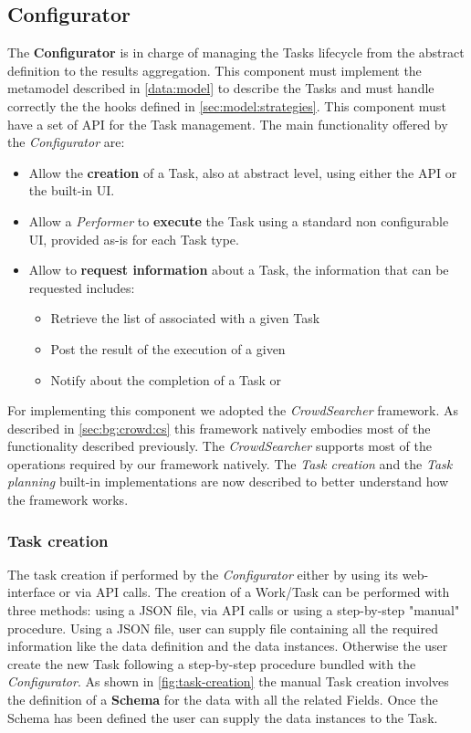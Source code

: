 \subsection{Configurator}\label{sec:configurator}
The \textbf{Configurator} is in charge of managing the Tasks lifecycle
from the abstract definition to the results aggregation. This component must
implement the metamodel described in \ref{data:model} to describe the Tasks and
must handle correctly the the hooks defined in \ref{sec:model:strategies}. This
component must have a set of API for the Task management.
The main functionality offered by the \emph{Configurator} are:
\begin{itemize}
    \item Allow the \textbf{creation} of a Task, also at abstract level, using
    either the API or the built-in UI.

    \item Allow a \emph{Performer} to \textbf{execute} the Task using a standard
    non configurable UI, provided as-is for each Task type.

    \item Allow to \textbf{request information} about a Task, the information
    that can be requested includes:
    \begin{itemize}
        \item Retrieve the list of \utask{} associated with a given Task

        \item Post the result of the execution of a given \utask{}

        \item Notify about the completion of a Task or \utask{}
    \end{itemize}
\end{itemize}

\noindent For implementing this component we adopted the
\emph{CrowdSearcher} framework.
As described in \ref{sec:bg:crowd:cs} this framework natively embodies most of
the functionality described previously. The \emph{CrowdSearcher} supports most
of the operations required by our framework natively. The \emph{Task creation}
and the \emph{Task planning} built-in implementations are now described to
better understand how the framework works.

\subsubsection{Task creation}
The task creation if performed by the \emph{Configurator} either by using its
web-interface or via API calls. The creation of a Work/Task can be performed with
three methods: using a JSON file, via API calls or using a step-by-step "manual" procedure.
Using a JSON file, user can supply file containing all the required information like
the data definition and the data instances.
Otherwise the user create the new Task following a step-by-step procedure bundled
with the \emph{Configurator}. As shown in \autoref{fig:task-creation} the manual Task
creation involves the definition of a \textbf{Schema} for the data with all the
related Fields. Once the Schema has been defined the user can supply the data
instances to the Task.

